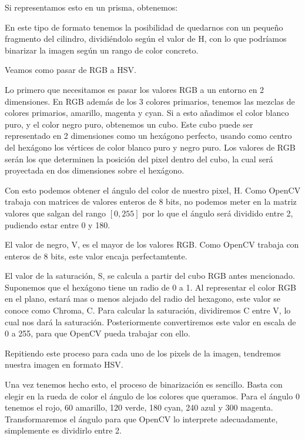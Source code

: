 Si representamos esto en un prisma, obtenemos:


En este tipo de formato tenemos la posibilidad de quedarnos con un pequeño fragmento del cilindro, dividiéndolo según el valor de H, con lo que podríamos binarizar la imagen según un rango de color concreto.

Veamos como pasar de RGB a HSV.

Lo primero que necesitamos es pasar los valores RGB a un entorno en 2 dimensiones. En RGB además de los 3 colores primarios, tenemos las mezclas de colores primarios, amarillo, magenta y cyan. Si a esto añadimos el color blanco puro, y el color negro puro, obtenemos un cubo. 
Este cubo puede ser representado en 2 dimensiones como un hexágono perfecto, usando como centro del hexágono los vértices de color blanco puro y negro puro. 
Los valores de RGB serán los que determinen la posición del pixel dentro del cubo, la cual será proyectada en dos dimensiones sobre el hexágono.


Con esto podemos obtener el ángulo del color de nuestro pixel, H. Como OpenCV trabaja con matrices de valores enteros de 8 bits, no podemos meter en la matriz valores que salgan del rango $[0,255]$ por lo que el ángulo será dividido entre 2, pudiendo estar entre 0 y 180.

El valor de negro, V, es el mayor de los valores RGB. Como OpenCV trabaja con enteros de 8 bits, este valor encaja perfectamtente.

El valor de la saturación, S, se calcula a partir del cubo RGB antes mencionado. Suponemos que el hexágono tiene un radio de 0 a 1. Al representar el color RGB en el plano, estará mas o menos alejado del radio del hexagono, este valor se conoce como Chroma, C. Para calcular la saturación, dividiremos C entre V, lo cual nos dará la saturación. Posteriormente convertiremos este valor en escala de 0 a 255, para que OpenCV pueda trabajar con ello.

Repitiendo este proceso para cada uno de los pixels de la imagen, tendremos nuestra imagen en formato HSV.

Una vez tenemos hecho esto, el proceso de binarización es sencillo. Basta con elegir en la rueda de color el ángulo de los colores que queramos. Para el ángulo 0 tenemos el rojo, 60 amarillo, 120 verde, 180 cyan, 240 azul y 300 magenta. Transformaremos el ángulo para que OpenCV lo interprete adecuadamente, simplemente es dividirlo entre 2.

